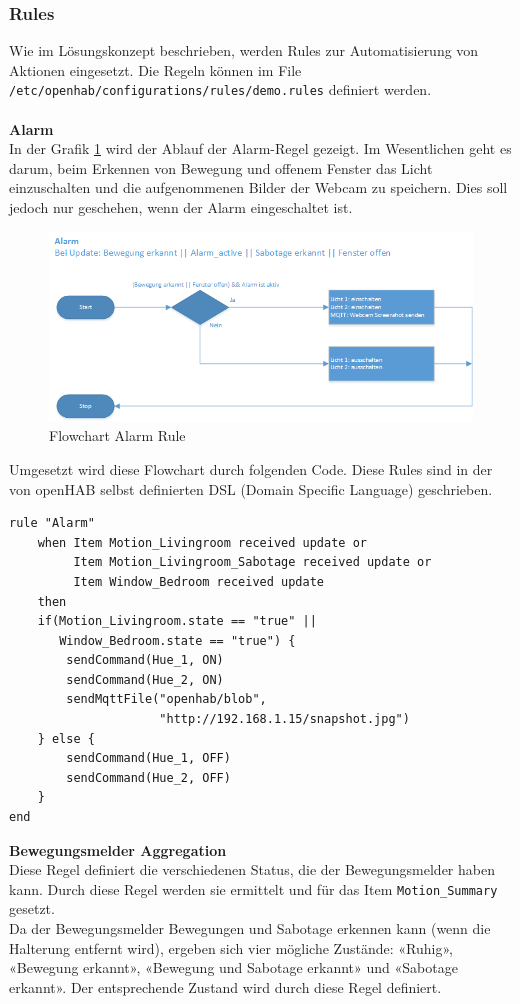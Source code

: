 \subsubsection{Rules}
Wie im Lösungskonzept beschrieben, werden Rules zur Automatisierung von Aktionen eingesetzt. Die Regeln können im File \lstinline!/etc/openhab/configurations/rules/demo.rules! definiert werden. \\\\
\textbf{Alarm} \\
In der Grafik \ref{fig:flowchartAlarm} wird der Ablauf der Alarm-Regel gezeigt. Im Wesentlichen geht es darum, beim Erkennen von Bewegung und offenem Fenster das Licht einzuschalten und die aufgenommenen Bilder der Webcam zu speichern. Dies soll jedoch nur geschehen, wenn der Alarm eingeschaltet ist.
\begin{figure}[H]
	\centering
		\includegraphics[scale=0.8]{report/img/RuleAlarm}
	\caption{Flowchart Alarm Rule}
	\label{fig:flowchartAlarm}
\end{figure}

Umgesetzt wird diese Flowchart durch folgenden Code. Diese Rules sind in der von openHAB selbst definierten DSL (Domain Specific Language) geschrieben.

\begin{lstlisting}[style=csharp, caption=demo.rules - Rule «Motion Aggregator»]
rule "Alarm"
	when Item Motion_Livingroom received update or
	     Item Motion_Livingroom_Sabotage received update or
	     Item Window_Bedroom received update
	then
	if(Motion_Livingroom.state == "true" ||
	   Window_Bedroom.state == "true") {
		sendCommand(Hue_1, ON)
		sendCommand(Hue_2, ON)
		sendMqttFile("openhab/blob",
					 "http://192.168.1.15/snapshot.jpg")
	} else {
		sendCommand(Hue_1, OFF)
		sendCommand(Hue_2, OFF)
	}
end
\end{lstlisting}

\textbf{Bewegungsmelder Aggregation} \\
Diese Regel definiert die verschiedenen Status, die der Bewegungsmelder haben kann. Durch diese Regel werden sie ermittelt und für das Item \lstinline!Motion_Summary! gesetzt. \\
Da der Bewegungsmelder Bewegungen und Sabotage erkennen kann (wenn die Halterung entfernt wird), ergeben sich vier mögliche Zustände: «Ruhig», «Bewegung erkannt», «Bewegung und Sabotage erkannt» und «Sabotage erkannt». Der entsprechende Zustand wird durch diese Regel definiert.

